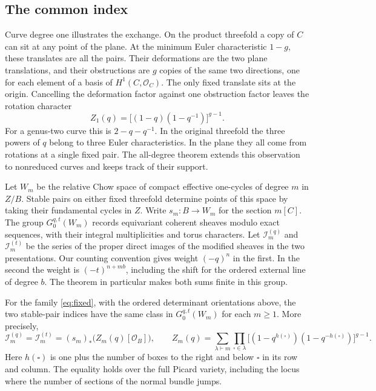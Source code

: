 \subsection{The common index}

Curve degree one illustrates the exchange. On the product threefold a
copy of $C$ can sit at any point of the plane. At the minimum Euler
characteristic $1-g$, these translates are all the pairs. Their
deformations are the two plane translations, and their obstructions
are $g$ copies of the same two directions, one for each element of a
basis of $H^1(C,\mathcal O_C)$. The only fixed translate sits at the
origin. Cancelling the deformation factor against one obstruction
factor leaves the rotation character
\[
             Z_1(q)=\big[(1-q)(1-q^{-1})\big]^{g-1}.
\]
For a genus-two curve this is $2-q-q^{-1}$. In the original threefold
the three powers of $q$ belong to three Euler characteristics. In the
plane they all come from rotations at a single fixed pair. The
all-degree theorem extends this observation to nonreduced curves and
keeps track of their support.

Let $W_m$ be the relative Chow space of compact effective one-cycles of
degree $m$ in $Z/B$. Stable pairs on either fixed threefold determine
points of this space by taking their fundamental cycles in $Z$.
Write $s_m:B\to W_m$ for the section $m[C]$. The group
$G_0^{q,t}(W_m)$ records equivariant coherent sheaves modulo exact
sequences, with their integral multiplicities and torus characters.
Let $\mathcal I_m^{(q)}$ and $\mathcal I_m^{(t)}$ be the series of the
proper direct images of the modified sheaves in the two presentations.
Our counting convention gives weight $(-q)^n$ in the first. In the
second the weight is $(-t)^{n+mb}$, including the shift for the ordered
external line of degree $b$. The theorem in particular makes both sums
finite in this group.

\begin{theorem}\label{thm:exchange}
For the family \eqref{eq:fixed}, with the ordered determinant orientations
above, the two stable-pair indices have the same class in
$G_0^{q,t}(W_m)$ for each $m\geq 1$. More precisely,
\begin{equation}
 \mathcal I_m^{(q)}=\mathcal I_m^{(t)}
 =(s_m)_*\bigl(Z_m(q)[\mathcal O_B]\bigr),\qquad
 Z_m(q)=\sum_{\lambda\vdash m}
      \prod_{\square\in\lambda}
        \big[(1-q^{h(\square)})(1-q^{-h(\square)})\big]^{g-1}.
 \label{eq:hook}
\end{equation}
Here $h(\square)$ is one plus the number of boxes to the right and below
$\square$ in its row and column. The equality holds over the full Picard
variety, including the locus where the number of sections of the normal
bundle jumps.
\end{theorem}

